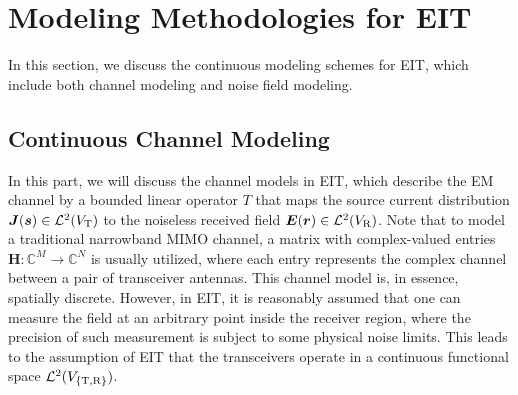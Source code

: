 \documentclass[journal,twocolumn]{IEEEtran}
\begin{document}


\section{Modeling Methodologies for EIT}
In this section, we discuss the continuous modeling schemes for EIT, which include both channel modeling and noise field modeling. 

\vspace{-1em}
\subsection{Continuous Channel Modeling}
In this part, we will discuss the channel models in EIT, which describe the EM channel by a bounded linear operator $T$ that maps the source current distribution ${\bm J}({\bm s})\in\mathcal{L}^2(V_{\rm T})$ to the noiseless received field ${\bm E}({\bm r})\in\mathcal{L}^2(V_{\rm R})$.   
Note that to model a traditional narrowband MIMO channel, a matrix with complex-valued entries ${\bm H}:\mathbb{C}^M\to\mathbb{C}^N$ is usually utilized, where each entry represents the complex channel between a pair of transceiver antennas. 
This channel model is, in essence, spatially discrete. 
However, in EIT, it is reasonably assumed that one can measure the field at an arbitrary point inside the receiver region, where the precision of such measurement is subject to some physical noise limits. This leads to the assumption of EIT that the transceivers operate in a continuous functional space $\mathcal{L}^2(V_{\{{\rm T, R}\}})$.  
\end{document}
